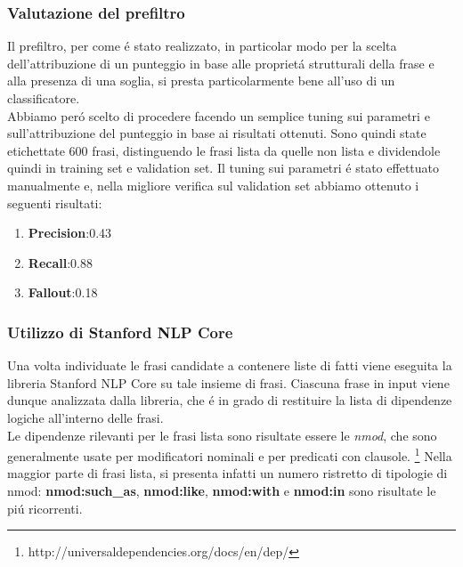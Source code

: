 \documentclass[twocolumn,10pt]{asme2ej}
\begin{document}
 \subsubsection{Valutazione del prefiltro}
 Il prefiltro, per come \'e stato realizzato, in particolar modo per la scelta dell'attribuzione di un punteggio in base alle propriet\'a strutturali della frase e alla presenza di una soglia, si presta particolarmente bene all'uso di un classificatore.\\ Abbiamo per\'o scelto di procedere facendo un semplice tuning sui parametri e sull'attribuzione del punteggio in base ai risultati ottenuti. Sono quindi state etichettate 600 frasi, distinguendo le frasi lista da quelle non lista e dividendole quindi in training set e validation set. Il tuning sui parametri \'e stato effettuato manualmente e, nella migliore verifica sul validation set abbiamo ottenuto i seguenti risultati:
 \begin{enumerate}
 \item \textbf{Precision}:0.43
  \item \textbf{Recall}:0.88
    \item \textbf{Fallout}:0.18


\end{enumerate}  


 \subsubsection{Utilizzo di Stanford  NLP Core}
Una volta individuate le frasi candidate a contenere liste di fatti viene eseguita la libreria Stanford NLP Core su tale insieme di frasi. Ciascuna frase in input viene dunque analizzata dalla libreria, che \'e in grado di restituire la lista di dipendenze logiche all'interno delle frasi. \\Le dipendenze rilevanti per le frasi lista sono risultate essere le \textit{nmod}, che sono generalmente usate per modificatori nominali e per predicati con clausole. \footnote{http://universaldependencies.org/docs/en/dep/} Nella maggior parte di frasi lista, si presenta infatti un numero ristretto di tipologie di nmod:  \textbf{nmod:such\_as}, \textbf{nmod:like}, \textbf{nmod:with} e \textbf{nmod:in} sono risultate le pi\'u ricorrenti.
\end{document}
